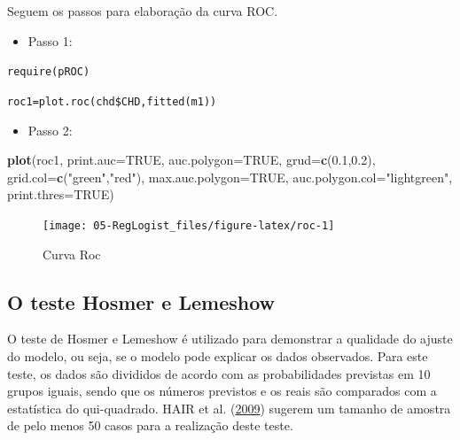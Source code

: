 \documentclass[12pt,brazil,oneside]{book}
\newenvironment{Shaded}{\begin{snugshade}}{\end{snugshade}}
\newcommand{\DataTypeTok}[1]{\textcolor[rgb]{0.13,0.29,0.53}{#1}}
\newcommand{\FloatTok}[1]{\textcolor[rgb]{0.00,0.00,0.81}{#1}}
\newcommand{\KeywordTok}[1]{\textcolor[rgb]{0.13,0.29,0.53}{\textbf{#1}}}
\newcommand{\NormalTok}[1]{#1}
\newcommand{\OtherTok}[1]{\textcolor[rgb]{0.56,0.35,0.01}{#1}}
\newcommand{\StringTok}[1]{\textcolor[rgb]{0.31,0.60,0.02}{#1}}
\providecommand{\tightlist}{%
  \setlength{\itemsep}{0pt}\setlength{\parskip}{0pt}}
\begin{document}
Seguem os passos para elaboração da curva ROC.

\begin{itemize}
\tightlist
\item
  Passo 1:
\end{itemize}

\texttt{require(pROC)}

\texttt{roc1=plot.roc(chd\$CHD,fitted(m1))}

\begin{itemize}
\tightlist
\item
  Passo 2:
\end{itemize}

\begin{Shaded}
\begin{Highlighting}[]
\KeywordTok{plot}\NormalTok{(roc1,}
     \DataTypeTok{print.auc=}\OtherTok{TRUE}\NormalTok{, }
     \DataTypeTok{auc.polygon=}\OtherTok{TRUE}\NormalTok{, }
     \DataTypeTok{grud=}\KeywordTok{c}\NormalTok{(}\FloatTok{0.1}\NormalTok{,}\FloatTok{0.2}\NormalTok{),}
     \DataTypeTok{grid.col=}\KeywordTok{c}\NormalTok{(}\StringTok{"green"}\NormalTok{,}\StringTok{"red"}\NormalTok{), }
     \DataTypeTok{max.auc.polygon=}\OtherTok{TRUE}\NormalTok{, }
     \DataTypeTok{auc.polygon.col=}\StringTok{"lightgreen"}\NormalTok{, }
     \DataTypeTok{print.thres=}\OtherTok{TRUE}\NormalTok{)}
\end{Highlighting}
\end{Shaded}

\begin{figure}[h]

{\centering \texttt{[image: 05-RegLogist\_files/figure-latex/roc-1]} 

}

\caption{Curva Roc}\label{fig:roc}
\end{figure}

\hypertarget{o-teste-hosmer-e-lemeshow}{%
\subsection{O teste Hosmer e Lemeshow}\label{o-teste-hosmer-e-lemeshow}}

O teste de Hosmer e Lemeshow é utilizado para demonstrar a qualidade do
ajuste do modelo, ou seja, se o modelo pode explicar os dados
observados. Para este teste, os dados são divididos de acordo com as
probabilidades previstas em 10 grupos iguais, sendo que os números
previstos e os reais são comparados com a estatística do qui-quadrado.
HAIR et al. (\protect\hyperlink{ref-Hair2009}{2009}) sugerem um tamanho
de amostra de pelo menos 50 casos para a realização deste teste.
\end{document}
